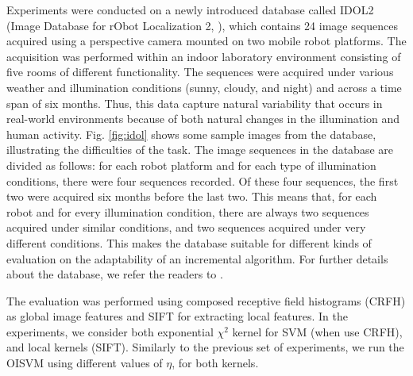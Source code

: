 Experiments were conducted on  a newly introduced database called IDOL2 
(Image Database for rObot Localization 2, \cite{luo:idol2}), 
which contains 24 image sequences acquired using a perspective
camera mounted on two mobile robot platforms. The acquisition was
performed within an indoor laboratory environment consisting of five 
rooms of different functionality. The sequences were acquired under
various weather and illumination conditions (sunny, cloudy, and night)
and across a time span of six months. Thus, this data capture natural
variability that occurs in real-world environments because of both 
natural changes in the illumination and human activity. Fig. \ref{fig:idol} 
shows some sample images from the database, illustrating the difficulties of
the task.
The image sequences in the database are divided as follows: for each robot
platform and for each type of illumination conditions, there were
four sequences recorded. Of these four sequences, the first two were 
acquired six months before the last two. This means that, for each robot
and for every illumination condition, there are always two sequences
acquired under similar conditions, and two sequences acquired under very
different conditions. This makes the database suitable for different kinds of
evaluation on the adaptability of an incremental algorithm. For further
details about the database, we refer the readers to \cite{luo:idol2}.

The evaluation was performed using composed receptive field histograms (CRFH)
\cite{linde:icpr04} as global image features and SIFT \cite{lowe99object} for
extracting local features. In the experiments, we consider both exponential $\chi^2$ kernel
for SVM (when use CRFH), and local kernels \cite{wallraven:iccv03} (SIFT).
Similarly to the previous set of experiments, we run the OISVM using different
values of $\eta$, for both kernels.

